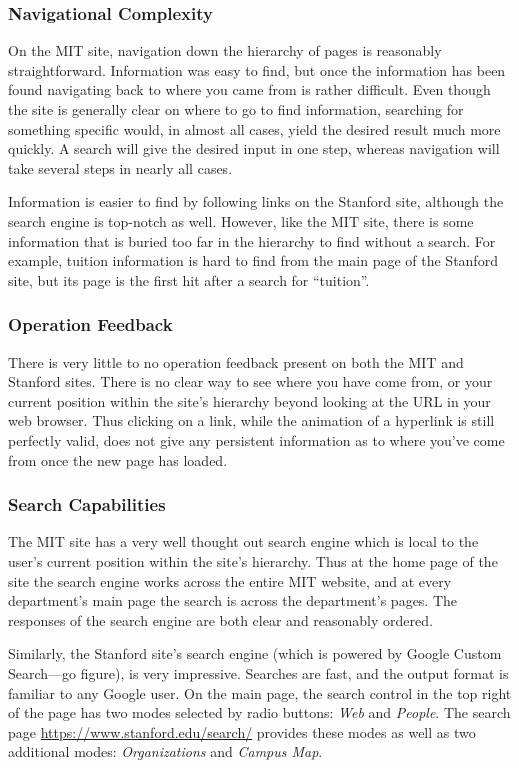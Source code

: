\subsubsection*{Navigational Complexity}

On the MIT site, navigation down the hierarchy of pages is reasonably straightforward.
Information was easy to find, but once the information has been found navigating back
to where you came from is rather difficult. Even though the site is generally clear on
where to go to find information, searching for something specific would, in almost all
cases, yield the desired result much more quickly. A search will give the desired input
in one step, whereas navigation will take several steps in nearly all cases.

Information is easier to find by following links on the Stanford site, although
the search engine is top-notch as well. However, like the MIT site, there is some
information that is buried too far in the hierarchy to find without a search.
For example, tuition information is hard to find from the main page of the Stanford
site, but its page is the first hit after a search for ``tuition''.

\subsubsection*{Operation Feedback}

There is very little to no operation feedback present on both the MIT and Stanford sites.
There is no clear way to see where you have come from, or your current
position within the site's hierarchy beyond looking at the URL in your web browser. Thus
clicking on a link, while the animation of a hyperlink is still perfectly valid, does not
give any persistent information as to where you've come from once the new page has loaded.

\subsubsection*{Search Capabilities}

The MIT site has a very well thought out search engine which is local to the user's current
position within the site's hierarchy. Thus at the home page of the site the search engine
works across the entire MIT website, and at every department's main page the search is
across the department's pages. The responses of the search engine are both clear and
reasonably ordered.

Similarly, the Stanford site's search engine (which is powered by Google Custom
Search---go figure), is very impressive. Searches are fast, and the output format is
familiar to any Google user. On the main page, the search control in the top right
of the page has two modes selected by radio buttons: \textsl{Web} and \textsl{People}.
The search page \url{https://www.stanford.edu/search/} provides these modes as well
as two additional modes: \textsl{Organizations} and \textsl{Campus Map}.

